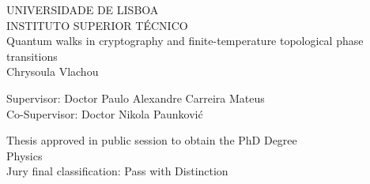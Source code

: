 \begin{center}
\vspace{0.5cm}
{\FontLb UNIVERSIDADE DE LISBOA} \\
\vspace{0.2cm}
{\FontLb INSTITUTO SUPERIOR T\'{E}CNICO} \\


\vspace{5.0cm}
{\FontHb 
Quantum walks in cryptography and finite-temperature topological phase transitions} \\

\vspace{3cm}
{\FontLn Chrysoula Vlachou} \\
\vspace{2cm}

\end{center}
\begin{flushleft}


{\FontMb Supervisor: \FontMn \qquad Doctor Paulo Alexandre Carreira Mateus} \\
{\FontMb Co-Supervisor: \FontMn \hspace{.0em} Doctor Nikola Paunkovi\'c} \\

\vspace{2.5cm}

\end{flushleft}
\begin{center}

{\FontMn Thesis approved in public session to obtain the PhD Degree} \\
{\FontMn Physics} \\
\vspace{1.5cm}
{\FontMb Jury final classification: } Pass with Distinction \\
\vfill
{} \\
%
\end{center}
\thispagestyle{empty}
\cleardoublepage

